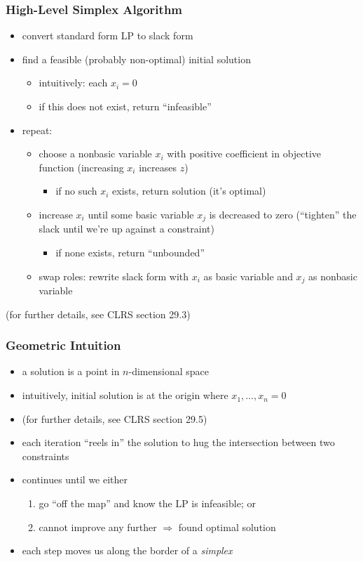 \documentclass[10pt,aspectratio=169]{beamer}
\begin{document}
\begin{frame} \frametitle{High-Level Simplex Algorithm}
  \begin{itemize}
    \item convert standard form LP to slack form
    \item find a feasible (probably non-optimal) initial solution
      \begin{itemize}
        \item intuitively: each $x_i=0$
      \item if this does not exist, return ``infeasible''
    \end{itemize}
    \item repeat:
    \begin{itemize}
      \item choose a nonbasic variable $x_i$ with positive coefficient in objective
        function (increasing $x_i$ increases $z$)
        \begin{itemize}
          \item if no such $x_i$ exists, return solution (it's optimal)
        \end{itemize}
      \item increase $x_i$ until some basic variable $x_j$ is decreased to zero
        (``tighten'' the slack until we're up against a constraint)
        \begin{itemize}
          \item if none exists, return ``unbounded''
        \end{itemize}
      \item swap roles: rewrite slack form with $x_i$ as basic variable and
        $x_j$ as nonbasic variable
    \end{itemize}
  \end{itemize}
  (for further details, see CLRS section 29.3)
\end{frame}

\begin{frame} \frametitle{Geometric Intuition}
\begin{itemize}
  \item a solution is a point in $n$-dimensional space
  \item intuitively, initial solution is at the origin where $x_1, \ldots, x_n = 0$
  \item (for further details, see CLRS section 29.5)
  \item each iteration ``reels in'' the solution to hug the intersection between
    two constraints
  \item continues until we either
  \begin{enumerate}
    \item go ``off the map'' and know the LP is infeasible; or
    \item cannot improve any further $\Rightarrow$ found optimal solution
  \end{enumerate}
  \item each step moves us along the border of a \emph{simplex}
\end{itemize}
\end{frame}
\end{document}
